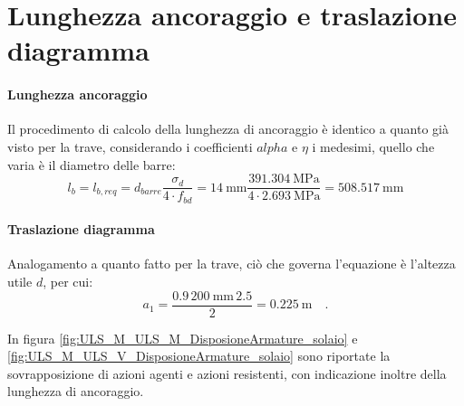 \section{Lunghezza ancoraggio e traslazione diagramma}
\paragraph{Lunghezza ancoraggio}
Il procedimento di calcolo della lunghezza di ancoraggio è identico a quanto già visto per la trave, considerando i coefficienti $alpha$ e $\eta$ i medesimi, quello che varia è il diametro delle barre:
\begin{equation}
l_{b} = l_{b,req} 
= d_{barre} \frac{ \sigma_{d} }{ 4 \cdot f_{bd} }  
= \SI{14}{\milli\metre}  \frac{ \SI{391.304}{\mega\pascal} }{ 4 \cdot \SI{2.693}{\mega\pascal} } 
= \SI{508.517}{\milli\metre}  
\end{equation}

\paragraph{Traslazione diagramma}
Analogamento a quanto fatto per la trave, ciò che governa l'equazione è l'altezza utile $d$, per cui:
\begin{equation}
    a_1 = \frac{0.9 \, \SI{200}{\milli\metre} \, 2.5}{2} = \SI{0.225}{\metre} \quad .
\end{equation}

In figura \ref{fig:ULS_M_ULS_M_DisposioneArmature_solaio} e \ref{fig:ULS_M_ULS_V_DisposioneArmature_solaio} sono riportate la sovrapposizione di azioni agenti e azioni resistenti, con indicazione inoltre della lunghezza di ancoraggio.


